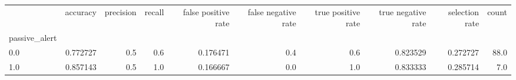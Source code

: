 \begin{tabular}{lrrrrrrrrr}
\toprule
{} &  accuracy &  precision &  recall &  false positive rate &  false negative rate &  true positive rate &  true negative rate &  selection rate &  count \\
passive\_alert &           &            &         &                      &                      &                     &                     &                 &        \\
\midrule
0.0           &  0.772727 &        0.5 &     0.6 &             0.176471 &                  0.4 &                 0.6 &            0.823529 &        0.272727 &   88.0 \\
1.0           &  0.857143 &        0.5 &     1.0 &             0.166667 &                  0.0 &                 1.0 &            0.833333 &        0.285714 &    7.0 \\
\bottomrule
\end{tabular}
